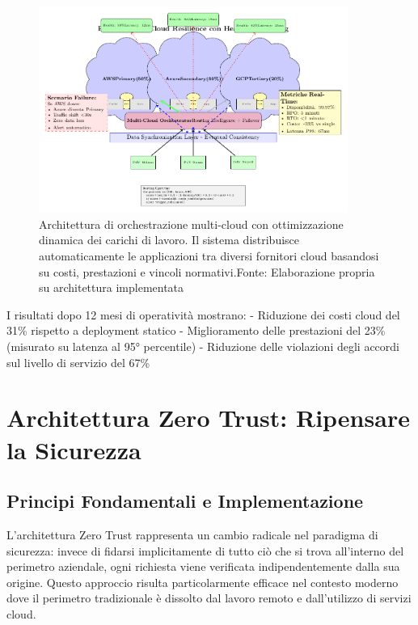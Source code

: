 \begin{figure}[htbp]
\centering
\includegraphics[width=0.9\textwidth]{thesis_figures/cap3/multicloud_pattern.pdf}
\caption{Architettura di orchestrazione multi-cloud con ottimizzazione dinamica dei carichi di lavoro. Il sistema distribuisce automaticamente le applicazioni tra diversi fornitori cloud basandosi su costi, prestazioni e vincoli normativi.Fonte: Elaborazione propria su architettura implementata}
\label{fig:multicloud_orchestration}
\end{figure}

I risultati dopo 12 mesi di operatività mostrano:
- Riduzione dei costi cloud del 31\% rispetto a deployment statico
- Miglioramento delle prestazioni del 23\% (misurato su latenza al 95° percentile)
- Riduzione delle violazioni degli accordi sul livello di servizio del 67\%

\section{Architettura Zero Trust: Ripensare la Sicurezza}

\subsection{Principi Fondamentali e Implementazione}

L'architettura Zero Trust rappresenta un cambio radicale nel paradigma di sicurezza: invece di fidarsi implicitamente di tutto ciò che si trova all'interno del perimetro aziendale, ogni richiesta viene verificata indipendentemente dalla sua origine. Questo approccio risulta particolarmente efficace nel contesto moderno dove il perimetro tradizionale è dissolto dal lavoro remoto e dall'utilizzo di servizi cloud.

